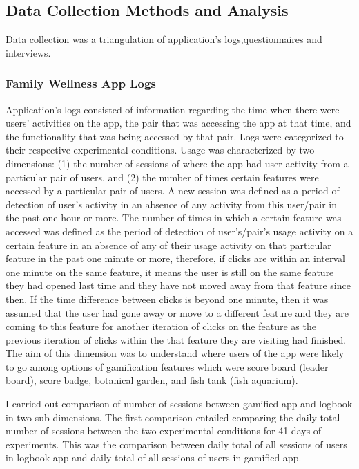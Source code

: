 \subsection{Data Collection Methods and Analysis}
Data collection was a triangulation of application's logs,questionnaires and interviews. 
\subsubsection{Family Wellness App Logs}
Application's logs consisted of information regarding the time when there were users' activities on the app, the pair that was accessing the app at that time, and the functionality that was being accessed by that pair. Logs were categorized to their respective experimental conditions. Usage was characterized by two dimensions: (1) the number of sessions of where the app had user activity from a particular pair of users, and (2) the number of times certain features were accessed by a particular pair of users. A new session was defined as a period of detection of user's activity in an absence of any activity from this user/pair in the past one hour or more. The number of times in which a certain feature was accessed was defined as the period of detection of user's/pair's usage activity on a certain feature in an absence of any of their usage activity on that particular feature in the past one minute or more, therefore, if clicks are within an interval one minute on the same feature, it means the user is still on the same feature they had opened last time and they have not moved away from that feature since then. If the time difference between clicks is beyond one minute, then it was assumed that the user had gone away or move to a different feature and they are coming to this feature for another iteration of clicks on the feature as the previous iteration of clicks within the that feature they are visiting had finished. The aim of this dimension was to understand where users of the app were likely to go among options of gamification features which were score board (leader board), score badge, botanical garden, and fish tank (fish aquarium). 
 
I carried out comparison of number of sessions between gamified app and logbook in two sub-dimensions. The first comparison entailed comparing the daily total number of sessions between the two experimental conditions for 41 days of experiments. This was the comparison between daily total of all sessions of users in logbook app and daily total of all sessions   of users in gamified app.

